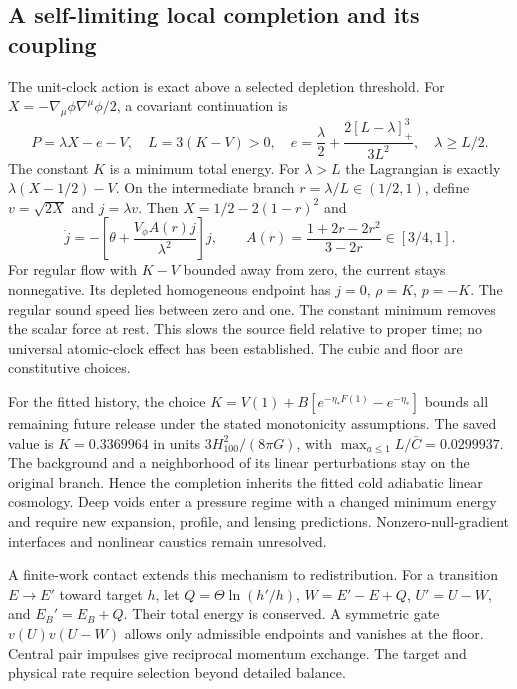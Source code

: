 \subsection{A self-limiting local completion and its coupling}
The unit-clock action is exact above a selected depletion threshold.
For $X=-\nabla_\mu\phi\nabla^\mu\phi/2$, a covariant continuation is
\begin{equation}
P=\lambda X-e-V,\quad L=3(K-V)>0,\quad
e=\frac\lambda2+\frac{2[L-\lambda]_+^3}{3L^2},\quad \lambda\ge L/2.
\end{equation}
The constant $K$ is a minimum total energy. For $\lambda>L$ the
Lagrangian is exactly $\lambda(X-1/2)-V$. On the intermediate branch
$r=\lambda/L\in(1/2,1)$, define $v=\sqrt{2X}$ and $j=\lambda v$.
Then $X=1/2-2(1-r)^2$ and
\begin{equation}
\dot j=-\left[\theta+\frac{V_\phi A(r)j}{\lambda^2}\right]j,
\qquad A(r)=\frac{1+2r-2r^2}{3-2r}\in[3/4,1].
\end{equation}
For regular flow with $K-V$ bounded away from zero, the current stays
nonnegative. Its depleted homogeneous endpoint has $j=0$,
$\rho=K$, $p=-K$. The regular sound speed lies between zero and one.
The constant minimum removes the scalar force at rest. This slows the
source field relative to proper time; no universal atomic-clock effect
has been established. The cubic and floor are constitutive choices.

For the fitted history, the choice
$K=V(1)+B[e^{-\eta_*F(1)}-e^{-\eta_*}]$ bounds all remaining future
release under the stated monotonicity assumptions. The saved value is
$K=0.3369964$ in units $3H_{100}^2/(8\pi G)$, with
$\max_{a\le1}L/\bar C=0.0299937$. The background and a neighborhood of
its linear perturbations stay on the original branch. Hence the
completion inherits the fitted cold adiabatic linear cosmology. Deep
voids enter a pressure regime with a changed minimum energy and require
new expansion, profile, and lensing predictions. Nonzero-null-gradient
interfaces and nonlinear caustics remain unresolved.

A finite-work contact extends this mechanism to redistribution. For
a transition $E\to E'$ toward target $h$, let
$Q=\Theta\ln(h'/h)$, $W=E'-E+Q$, $U'=U-W$, and $E_B'=E_B+Q$.
Their total energy is conserved. A symmetric gate $v(U)v(U-W)$ allows
only admissible endpoints and vanishes at the floor. Central pair
impulses give reciprocal momentum exchange. The target and physical
rate require selection beyond detailed balance. 

